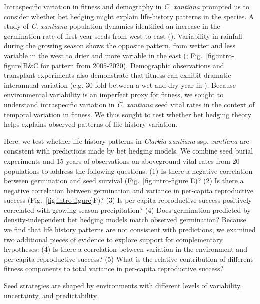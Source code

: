 \documentclass[12pt, oneside, titlepage]{article}   	%
\begin{document}
Intraspecific variation in fitness and demography in \textit{C. xantiana} prompted us to consider whether bet hedging might explain life-history patterns in the species. A study of \textit{C. xantiana} population dynamics identified an increase in the germination rate of first-year seeds from west to east (\cite{eckhart2011}). Variability in rainfall during the growing season shows the opposite pattern, from wetter and less variable in the west to drier and more variable in the east (\cite{eckhart2011}; Fig.~\ref{fig:intro-figure}B\&C for pattern from 2005-2020). Demographic observations \cite{eckhart2011} and transplant experiments also demonstrate that fitness can exhibit dramatic interannual variation (e.g. 30-fold between a wet and dry year in \cite{geber2005}). Because environmental variability is an imperfect proxy for fitness, we sought to understand intraspecific variation in \textit{C. xantiana} seed vital rates in the context of temporal variation in fitness. We thus sought to test whether bet hedging theory helps explains observed patterns of life history variation.
 
Here, we test whether life history patterns in \textit{Clarkia xantiana} ssp. \textit{xantiana} are consistent with predictions made by bet hedging models. We combine seed burial experiments and 15 years of observations on aboveground vital rates from 20 populations to address the following questions: (1) Is there a negative correlation between germination and seed survival (Fig.~\ref{fig:intro-figure}E)? (2) Is there a negative correlation between germination and variance in per-capita reproductive success (Fig.~\ref{fig:intro-figure}F)? (3)  Is per-capita reproductive success positively correlated with growing season precipitation? (4) Does germination predicted by density-independent bet hedging models match observed germination? Because we find that life history patterns are not consistent with predictions, we examined two additional pieces of evidence to explore support for complementary hypotheses: (4) Is there a correlation between variation in the environment and per-capita reproductive success? (5) What is the relative contribution of different fitness components to total variance in per-capita reproductive success? %

\iffalse
Seed strategies are shaped by environments with different levels of variability, uncertainty, and predictability. 
\end{document}
